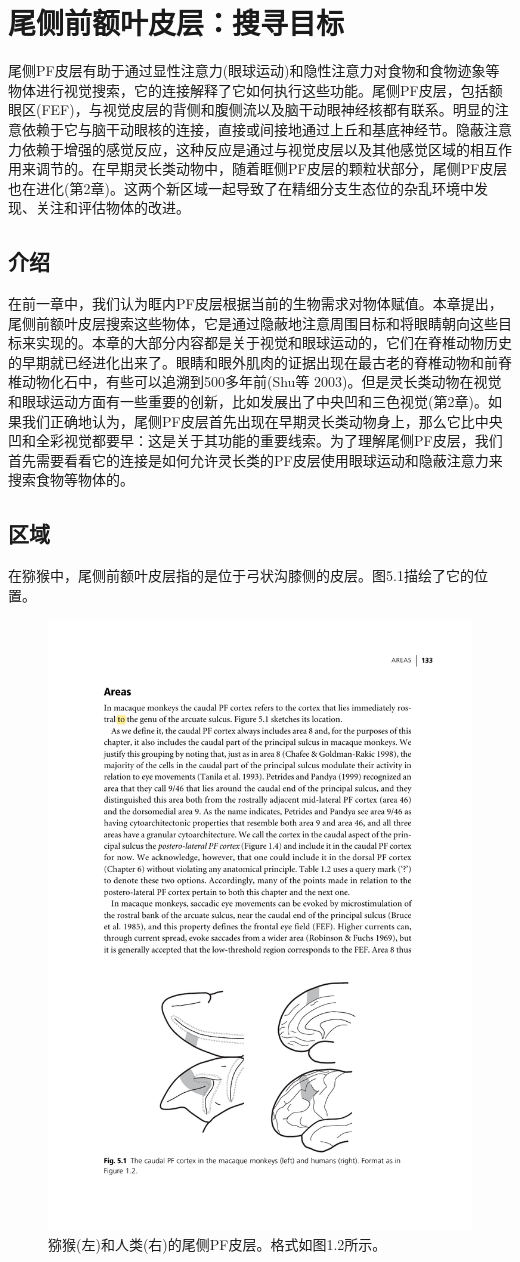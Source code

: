 \chapter{尾侧前额叶皮层：搜寻目标}
尾侧PF皮层有助于通过显性注意力(眼球运动)和隐性注意力对食物和食物迹象等物体进行视觉搜索，它的连接解释了它如何执行这些功能。尾侧PF皮层，包括额眼区(FEF)，与视觉皮层的背侧和腹侧流以及脑干动眼神经核都有联系。明显的注意依赖于它与脑干动眼核的连接，直接或间接地通过上丘和基底神经节。隐蔽注意力依赖于增强的感觉反应，这种反应是通过与视觉皮层以及其他感觉区域的相互作用来调节的。在早期灵长类动物中，随着眶侧PF皮层的颗粒状部分，尾侧PF皮层也在进化(第2章)。这两个新区域一起导致了在精细分支生态位的杂乱环境中发现、关注和评估物体的改进。

\section{介绍}
在前一章中，我们认为眶内PF皮层根据当前的生物需求对物体赋值。本章提出，尾侧前额叶皮层搜索这些物体，它是通过隐蔽地注意周围目标和将眼睛朝向这些目标来实现的。本章的大部分内容都是关于视觉和眼球运动的，它们在脊椎动物历史的早期就已经进化出来了。眼睛和眼外肌肉的证据出现在最古老的脊椎动物和前脊椎动物化石中，有些可以追溯到500多年前(Shu等 2003)。但是灵长类动物在视觉和眼球运动方面有一些重要的创新，比如发展出了中央凹和三色视觉(第2章)。如果我们正确地认为，尾侧PF皮层首先出现在早期灵长类动物身上，那么它比中央凹和全彩视觉都要早：这是关于其功能的重要线索。为了理解尾侧PF皮层，我们首先需要看看它的连接是如何允许灵长类的PF皮层使用眼球运动和隐蔽注意力来搜索食物等物体的。
\section{区域}
在猕猴中，尾侧前额叶皮层指的是位于弓状沟膝侧的皮层。图5.1描绘了它的位置。
\begin{figure}
	\centering
	\includegraphics[width=0.7\linewidth]{image_pfc/Fig_5_1}
	\caption{猕猴(左)和人类(右)的尾侧PF皮层。格式如图1.2所示。}
	\label{fig:fig}
\end{figure}

